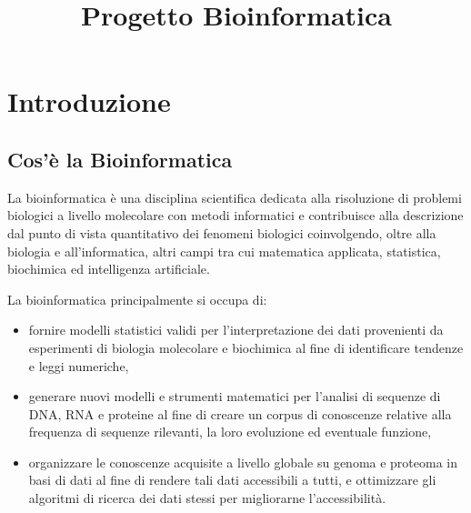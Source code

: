 \documentclass[10pt,a4paper]{report}
\title{Progetto Bioinformatica}
\begin{document}

\tableofcontents
\newpage
\chapter{Introduzione}
\section{Cos'è la Bioinformatica}
La bioinformatica è una disciplina scientifica dedicata alla risoluzione di problemi biologici a livello molecolare con metodi informatici e contribuisce alla descrizione dal punto di vista quantitativo dei fenomeni biologici coinvolgendo, oltre alla biologia e all'informatica, altri campi tra cui matematica applicata, statistica, biochimica ed intelligenza artificiale.

La bioinformatica principalmente si occupa di:
\begin{itemize}
\item fornire modelli statistici validi per l'interpretazione dei dati provenienti da esperimenti di biologia molecolare e biochimica al fine di identificare tendenze e leggi numeriche,
\item generare nuovi modelli e strumenti matematici per l'analisi di sequenze di DNA, RNA e proteine al fine di creare un corpus di conoscenze relative alla frequenza di sequenze rilevanti, la loro evoluzione ed eventuale funzione,
\item organizzare le conoscenze acquisite a livello globale su genoma e proteoma in basi di dati al fine di rendere tali dati accessibili a tutti, e ottimizzare gli algoritmi di ricerca dei dati stessi per migliorarne l'accessibilità.
\end{itemize}
\end{document}
